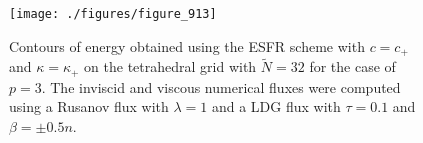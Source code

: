 \newpage
\begin{figure}
\centering
\texttt{[image: ./figures/figure\_913]} \\
\caption{Contours of energy obtained using the ESFR scheme with $c = c_+$ and $\kappa = \kappa_+$ on the tetrahedral grid with $\tilde{N} = 32$ for the case of $p = 3$. The inviscid and viscous numerical fluxes were computed using a Rusanov flux with $\lambda = 1$ and a LDG flux with $\tau = 0.1$ and $\beta = \pm 0.5n$.}
\label{fig:figure_913}
\end{figure}
%
%
%
